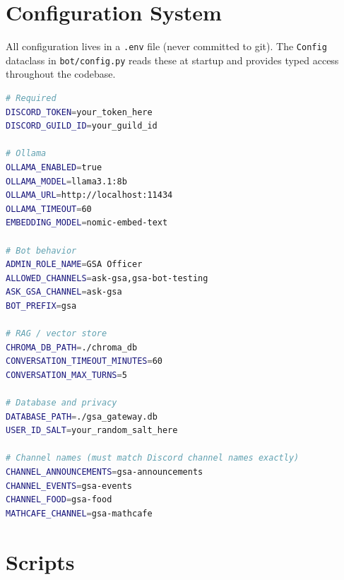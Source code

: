 \documentclass[12pt,letterpaper]{article}
\begin{document}
\section{Configuration System}

All configuration lives in a \texttt{.env} file (never committed to git). The
\texttt{Config} dataclass in \texttt{bot/config.py} reads these at startup and
provides typed access throughout the codebase.

\begin{lstlisting}[language=bash, caption={Key .env variables}]
# Required
DISCORD_TOKEN=your_token_here
DISCORD_GUILD_ID=your_guild_id

# Ollama
OLLAMA_ENABLED=true
OLLAMA_MODEL=llama3.1:8b
OLLAMA_URL=http://localhost:11434
OLLAMA_TIMEOUT=60
EMBEDDING_MODEL=nomic-embed-text

# Bot behavior
ADMIN_ROLE_NAME=GSA Officer
ALLOWED_CHANNELS=ask-gsa,gsa-bot-testing
ASK_GSA_CHANNEL=ask-gsa
BOT_PREFIX=gsa

# RAG / vector store
CHROMA_DB_PATH=./chroma_db
CONVERSATION_TIMEOUT_MINUTES=60
CONVERSATION_MAX_TURNS=5

# Database and privacy
DATABASE_PATH=./gsa_gateway.db
USER_ID_SALT=your_random_salt_here

# Channel names (must match Discord channel names exactly)
CHANNEL_ANNOUNCEMENTS=gsa-announcements
CHANNEL_EVENTS=gsa-events
CHANNEL_FOOD=gsa-food
MATHCAFE_CHANNEL=gsa-mathcafe
\end{lstlisting}

\section{Scripts}
\end{document}
